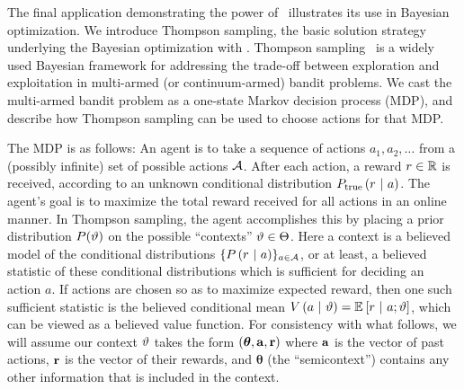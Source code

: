 The final application demonstrating the power of \gpmem\ illustrates its use in Bayesian optimization. We introduce Thompson sampling, the basic solution strategy
underlying the Bayesian optimization with \gpmem.
Thompson sampling~\cite{thompson1933likelihood} is a widely used Bayesian
framework for addressing the trade-off between exploration and exploitation in
multi-armed (or continuum-armed) bandit problems.  
We cast the multi-armed bandit problem as a one-state Markov
decision process (MDP), and describe how Thompson sampling can be used to choose
actions for that MDP.

The MDP is as follows: An agent is to take a sequence of actions $a_1, a_2,
\ldots$ from a (possibly infinite) set of possible actions $\mathcal{A}$.  After each
action, a reward $r \in \mathbb{R}$ is received, according to an unknown conditional
distribution $P_{\textrm{true}}\left( r \ \middle\vert\  a \right)$.  The agent's goal is to maximize the
total reward received for all actions in an online manner.  In Thompson
sampling, the agent accomplishes this by placing a prior distribution
$P(\vartheta)$ on the possible ``contexts'' $\vartheta \in \Theta$.  Here a context
is a believed model of the conditional distributions $\{P\left( r \ \middle\vert\  a \right)\}_{a
\in \mathcal{A}}$, or at least, a believed statistic of these conditional
distributions which is sufficient for deciding an action $a$.  If actions are
chosen so as to maximize expected reward, then one such sufficient statistic is
the believed conditional mean $V \left( a \ \middle\vert\  \vartheta \right) = \mathbb{E}_{}\left[ r \ \middle\vert\ 
a;\vartheta \right]$, which can be viewed as a believed value function.  For
consistency with what follows, we will assume our context $\vartheta$ takes the
form $(\bm{\theta}, \mathbf{a}, \mathbf{r})$ where $\mathbf{a}$ is the vector of past
actions, $\mathbf{r}$ is the vector of their rewards, and $\bm{\theta}$ (the
``semicontext'') contains any other information that is included in the context.

